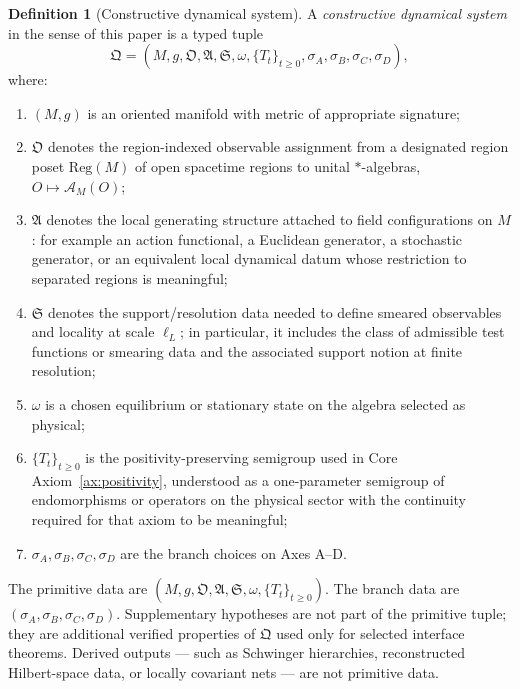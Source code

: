 \documentclass[12pt,a4paper]{article}
\theoremstyle{plain}
\theoremstyle{definition}
\newtheorem{definition}[theorem]{Definition}
\theoremstyle{remark}
\newcommand{\alg}{\mathcal{A}}
\begin{document}
\begin{definition}[Constructive dynamical system]
  \label{def:cds}
  A \emph{constructive dynamical system} in the sense of this paper is
  a typed tuple
  \[
    \mathfrak{Q}
    = (M,g,\mathfrak{O},\mathfrak{A},\mathfrak{S},\omega,\{T_t\}_{t\ge0},
    \sigma_A,\sigma_B,\sigma_C,\sigma_D),
  \]
  where:
  \begin{enumerate}[nosep,label=(\roman*)]
  \item $(M,g)$ is an oriented manifold with metric of appropriate
    signature;
  \item $\mathfrak{O}$ denotes the region-indexed observable
    assignment from a designated region poset
    \(\mathrm{Reg}(M)\) of open spacetime regions to unital
    \( * \)-algebras, \(O \mapsto \alg_M(O)\);
  \item $\mathfrak{A}$ denotes the local generating structure
    attached to field configurations on \(M\): for example an action
    functional, a Euclidean generator, a stochastic generator, or an
    equivalent local dynamical datum whose restriction to separated
    regions is meaningful;
  \item $\mathfrak{S}$ denotes the support/resolution data needed to
    define smeared observables and locality at scale \(\ell_L\); in
    particular, it includes the class of admissible test functions or
    smearing data and the associated support notion at finite
    resolution;
  \item \(\omega\) is a chosen equilibrium or stationary state on the
    algebra selected as physical;
  \item \(\{T_t\}_{t\ge0}\) is the positivity-preserving semigroup
    used in Core Axiom~\ref{ax:positivity}, understood as a
    one-parameter semigroup of endomorphisms or operators on the
    physical sector with the continuity required for that axiom to be
    meaningful;
  \item \(\sigma_A,\sigma_B,\sigma_C,\sigma_D\) are the branch choices
    on Axes A--D.
  \end{enumerate}
  The primitive data are \((M,g,\mathfrak{O},\mathfrak{A},
  \mathfrak{S},\omega,\{T_t\}_{t\ge0})\). The branch data are
  \((\sigma_A,\sigma_B,\sigma_C,\sigma_D)\). Supplementary hypotheses
  are not part of the primitive tuple; they are additional verified
  properties of \(\mathfrak{Q}\) used only for selected interface
  theorems. Derived outputs --- such as Schwinger hierarchies,
  reconstructed Hilbert-space data, or locally covariant nets --- are
  not primitive data.
\end{definition}
\end{document}
